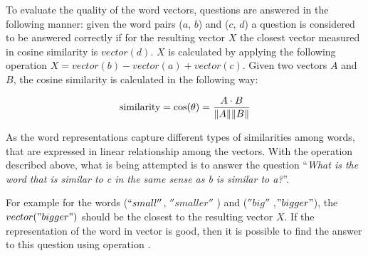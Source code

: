 To evaluate the quality of the word vectors, questions  are answered in the
following manner: given the word pairs ($a$, $b$) and ($c$, $d$) a question
is considered to be answered correctly if  for the resulting vector $X$ the closest vector measured in
cosine similarity is  $vector(d)$. $X$ is calculated by applying the following
operation $X = vector(b) - vector(a) + vector(c)$.  Given two vectors $A$ and $B$, the
cosine similarity is calculated in the following way: 

$$\text{similarity} = \cos(\theta) = {A \cdot B \over \|A\| \|B\|}$$


As the word representations capture different types of  similarities among
words, that are expressed in linear relationship among the vectors. With the
operation described above,  what is  being attempted is to answer the
question ``\emph{What is the word that is similar to 
c in the same sense as b is similar to a?}''.

For example  for the words ($``small''$, $''smaller''$ ) and ($''big''$ ,$"bigger"$),
the $vector("bigger")$ should be the closest to the resulting
vector $X$.   If the representation of the word in
vector  is good, then it is possible to find the answer to this question
using  operation \cite{DBLP:journals/corr/abs-1301-3781}.



\renewcommand{\arraystretch}{1.3}


